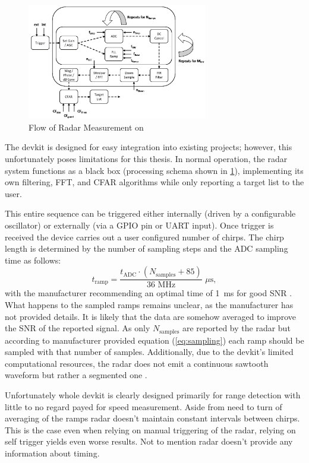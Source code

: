 \begin{figure}[h!]
  \centering
  \includegraphics[width=0.7\textwidth]{../img/sidar_flow.png}
  \caption[Flow of Radar Measurement on \sidar \cite{sidarPRO}]{Flow of Radar Measurement on \sidar}
  \label{fig:sidarFlow}
\end{figure}

The devkit is designed for easy integration into existing projects; however, this unfortunately poses limitations for this thesis.
In normal operation, the radar system functions as a black box (processing schema shown in \ref{fig:sidarFlow}), implementing its own filtering, FFT, and CFAR algorithms while only reporting a target list to the user.

This entire sequence can be triggered either internally (driven by a configurable oscillator) or externally (via a GPIO pin or UART input).
Once trigger is received the device carries out a user configured number of chirps.
The chirp length is determined by the number of sampling steps and the ADC sampling time as follows:
\begin{equation}
  t_\mathrm{ramp} = \frac{t_\mathrm{ADC} \cdot  (N_\mathrm{samples} + 85)}{36\,\, \mathrm{MHz}} \,\, \mu\mathrm{s},
  \label{eq:sampling}
\end{equation}
with the manufacturer recommending an optimal time of 1~ms for good SNR \cite{sidarPRO}.
What happens to the sampled ramps remains unclear, as the manufacturer has not provided details.
It is likely that the data are somehow averaged to improve the SNR of the reported signal.
As only $N_\mathrm{samples}$ are reported by the radar but according to manufacturer provided equation (\ref{eq:sampling}) each ramp should be sampled with that number of samples.
Additionally, due to the devkit's limited computational resources, the radar does not emit a continuous sawtooth waveform but rather a segmented one \cite{sidarPRO}.

Unfortunately whole devkit is clearly designed primarily for range detection with little to no regard payed for speed measurement.
Aside from need to turn of averaging of the ramps radar doesn't maintain constant intervals between chirps.
This is the case even when relying on manual triggering of the radar, relying on self trigger yields even worse results.
Not to mention radar doesn't provide any information about timing.

